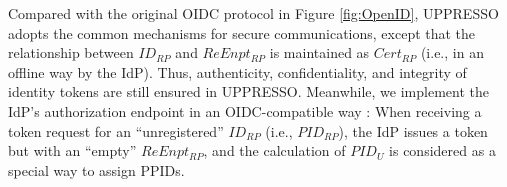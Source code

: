 %

Compared with the original OIDC protocol in Figure \ref{fig:OpenID},
UPPRESSO adopts the common mechanisms for secure communications,
except that the relationship between $ID_{RP}$ and $ReEnpt_{RP}$ is maintained as $Cert_{RP}$ (i.e., in an offline way by the IdP).
Thus, authenticity, confidentiality, and integrity of identity tokens are still ensured in UPPRESSO.
Meanwhile, we implement the IdP's authorization endpoint in an OIDC-compatible way \cite{rfc6749,OpenIDConnect}:
        When receiving a token request for an ``unregistered'' $ID_{RP}$ (i.e., $PID_{RP}$),
the IdP issues a token but with an ``empty'' $ReEnpt_{RP}$,
    and the calculation of $PID_{U}$ is considered as a special way to assign PPIDs.

